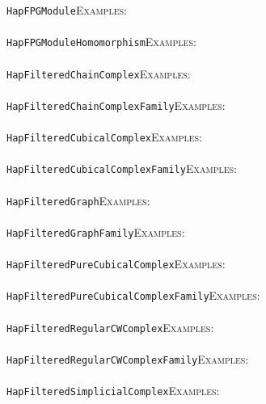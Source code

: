 \documentclass[a4paper,11pt]{report}
\begin{document}
{{ \texttt{HapFPGModule}{\nobreakspace}{\nobreakspace}{\nobreakspace}{\nobreakspace}\textsc{Examples:} \\
 \\
 \texttt{HapFPGModuleHomomorphism}{\nobreakspace}{\nobreakspace}{\nobreakspace}{\nobreakspace}\textsc{Examples:} \\
 \\
 \texttt{HapFilteredChainComplex}{\nobreakspace}{\nobreakspace}{\nobreakspace}{\nobreakspace}\textsc{Examples:} \\
 \\
 \texttt{HapFilteredChainComplexFamily}{\nobreakspace}{\nobreakspace}{\nobreakspace}{\nobreakspace}\textsc{Examples:} \\
 \\
 \texttt{HapFilteredCubicalComplex}{\nobreakspace}{\nobreakspace}{\nobreakspace}{\nobreakspace}\textsc{Examples:} \\
 \\
 \texttt{HapFilteredCubicalComplexFamily}{\nobreakspace}{\nobreakspace}{\nobreakspace}{\nobreakspace}\textsc{Examples:} \\
 \\
 \texttt{HapFilteredGraph}{\nobreakspace}{\nobreakspace}{\nobreakspace}{\nobreakspace}\textsc{Examples:} \\
 \\
 \texttt{HapFilteredGraphFamily}{\nobreakspace}{\nobreakspace}{\nobreakspace}{\nobreakspace}\textsc{Examples:} \\
 \\
 \texttt{HapFilteredPureCubicalComplex}{\nobreakspace}{\nobreakspace}{\nobreakspace}{\nobreakspace}\textsc{Examples:} \\
 \\
 \texttt{HapFilteredPureCubicalComplexFamily}{\nobreakspace}{\nobreakspace}{\nobreakspace}{\nobreakspace}\textsc{Examples:} \\
 \\
 \texttt{HapFilteredRegularCWComplex}{\nobreakspace}{\nobreakspace}{\nobreakspace}{\nobreakspace}\textsc{Examples:} \\
 \\
 \texttt{HapFilteredRegularCWComplexFamily}{\nobreakspace}{\nobreakspace}{\nobreakspace}{\nobreakspace}\textsc{Examples:} \\
 \\
 \texttt{HapFilteredSimplicialComplex}{\nobreakspace}{\nobreakspace}{\nobreakspace}{\nobreakspace}\textsc{Examples:} \\
 \\
}}
\end{document}
